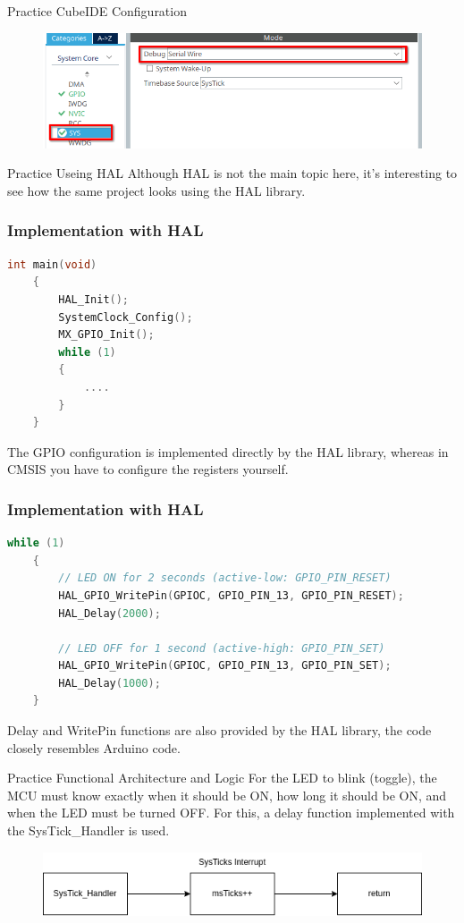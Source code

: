 \documentclass{beamer}
\begin{document}
\begin{frame}{Practice}
	{CubeIDE Configuration}
	\begin{figure}
		\includegraphics[width=\linewidth]{Blink_002.png}
	\end{figure}
\end{frame}
\begin{frame}{Practice}
	{Useing HAL}
	Although HAL is not the main topic here, it’s interesting to see how the same project looks using the HAL library.
	
\end{frame}
\begin{frame}[fragile]
	\frametitle{Implementation with HAL}
	\begin{lstlisting}[language=C]
int main(void)
	{
		HAL_Init();
		SystemClock_Config();
		MX_GPIO_Init();
		while (1)
		{
			....
		}
	}
	\end{lstlisting}
	The GPIO configuration is implemented directly by the HAL library, whereas in CMSIS you have to configure the registers yourself.
\end{frame}
\begin{frame}[fragile]
	\frametitle{Implementation with HAL}
	\begin{lstlisting}[language=C]
while (1)
	{
		// LED ON for 2 seconds (active-low: GPIO_PIN_RESET)
		HAL_GPIO_WritePin(GPIOC, GPIO_PIN_13, GPIO_PIN_RESET);
		HAL_Delay(2000);
			
		// LED OFF for 1 second (active-high: GPIO_PIN_SET)
		HAL_GPIO_WritePin(GPIOC, GPIO_PIN_13, GPIO_PIN_SET);
		HAL_Delay(1000);
	}
	\end{lstlisting}
	Delay and WritePin functions are also provided by the HAL library, the code closely resembles Arduino code.
\end{frame}
\begin{frame}{Practice}
	{Functional Architecture and Logic}
	For the LED to blink (toggle), the MCU must know exactly when it should be ON, how long it should be ON, and when the LED must be turned OFF. For this, a delay function implemented with the SysTick\_Handler is used.
	\begin{figure}
		\centering
		\includegraphics[width=\linewidth]{Blink_003.png}
	\end{figure}
\end{frame}
\end{document}

